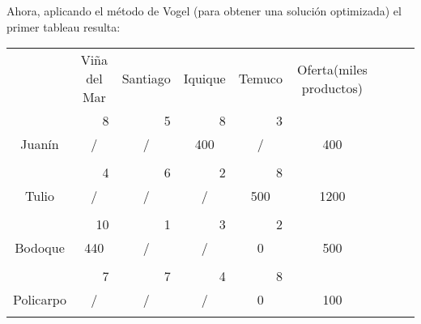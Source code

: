\documentclass[12pt,letterpaper]{article}
\begin{document}
Ahora, aplicando el método de Vogel (para obtener una solución optimizada) el primer tableau resulta:
\begin{center}
\begin{tabular}{ccc|ccc|ccc|ccc|ccc|ccc|ccc}
\multicolumn{3}{c|}{} & \multicolumn{3}{c}{Viña del Mar} & \multicolumn{3}{c}{Santiago} & \multicolumn{3}{c}{Iquique} & \multicolumn{3}{c|}{Temuco} & \multicolumn{3}{c}{Oferta(miles productos)}\\
\cline{1-15}
\multicolumn{3}{c|}{} & \multicolumn{3}{r|}{8} & \multicolumn{3}{r|}{5} & \multicolumn{3}{r|}{8} & \multicolumn{3}{r|}{3} \\
\multicolumn{3}{c|}{Juanín} & \multicolumn{3}{c|}{/} & \multicolumn{3}{c|}{/} & \multicolumn{3}{c|}{400} & \multicolumn{3}{c|}{/}& \multicolumn{3}{c}{400}\\
\multicolumn{3}{c|}{} & \multicolumn{3}{c|}{} & \multicolumn{3}{c|}{} & \multicolumn{3}{c|}{} & \multicolumn{3}{c|}{}\\
\cline{1-15}
\multicolumn{3}{c|}{} & \multicolumn{3}{r|}{4} & \multicolumn{3}{r|}{6} & \multicolumn{3}{r|}{2} & \multicolumn{3}{r|}{8} \\
\multicolumn{3}{c|}{Tulio} & \multicolumn{3}{c|}{/} & \multicolumn{3}{c|}{/} & \multicolumn{3}{c|}{/} & \multicolumn{3}{c|}{500}& \multicolumn{3}{c}{1200}\\
\multicolumn{3}{c|}{} & \multicolumn{3}{c|}{} & \multicolumn{3}{c|}{} & \multicolumn{3}{c|}{} & \multicolumn{3}{c|}{}\\
\cline{1-15}
\multicolumn{3}{c|}{} & \multicolumn{3}{r|}{10} & \multicolumn{3}{r|}{1} & \multicolumn{3}{r|}{3} & \multicolumn{3}{r|}{2} \\
\multicolumn{3}{c|}{Bodoque} & \multicolumn{3}{c|}{440} & \multicolumn{3}{c|}{/} & \multicolumn{3}{c|}{/} & \multicolumn{3}{c|}{0}& \multicolumn{3}{c}{500}\\
\multicolumn{3}{c|}{} & \multicolumn{3}{c|}{} & \multicolumn{3}{c|}{} & \multicolumn{3}{c|}{} & \multicolumn{3}{c|}{}\\
\cline{1-15}
\multicolumn{3}{c|}{} & \multicolumn{3}{r|}{7} & \multicolumn{3}{r|}{7} & \multicolumn{3}{r|}{4} & \multicolumn{3}{r|}{8} \\
\multicolumn{3}{c|}{Policarpo} & \multicolumn{3}{c|}{/} & \multicolumn{3}{c|}{/} & \multicolumn{3}{c|}{/} & \multicolumn{3}{c|}{0}& \multicolumn{3}{c}{100}\\
\multicolumn{3}{c|}{} & \multicolumn{3}{c|}{} & \multicolumn{3}{c|}{} & \multicolumn{3}{c|}{} & \multicolumn{3}{c|}{}\\

\end{tabular}
\end{center}
\end{document}
